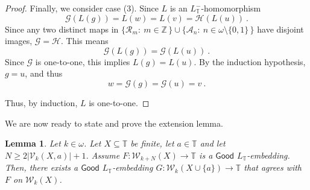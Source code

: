 \documentclass[10pt,a4paper, openany,  oldfontcommands]{memoir}
\newtheorem{lemma} [theorem] {Lemma}
\newtheorem{open problem} [theorem] {Open Problem}
\newtheorem{open question} [theorem] {Open Question}
\begin{document}
\begin{proof}
 
 Finally,  we consider case (3). 
 Since  $ L$  is  an $L_{  \mathbb{T}  }^-$-homomorphism 
\[
 \mathcal{G}    \left(  L(g)  \right)      =  L(w)   =  L(v)   =     \mathcal{H}    \left(  L(u)  \right)  
\     .
\]
Since   any two distinct maps in   
$  \big\lbrace   \mathcal{R}_m   :   \   m  \in  \mathbb{Z}   \,   \rbrace    \cup  
 \big\lbrace   \mathcal{A}_n   :   \   n   \in     \omega  \setminus  \lbrace 0,  1  \rbrace   \,   \rbrace         $ 
 have disjoint images,   
 $   \mathcal{G}    =    \mathcal{H}  $. 
 This means  
 \[
  \mathcal{G}    \left(  L(g)  \right)   =   \mathcal{G}    \left(  L(u)  \right) 
  \      .
 \] 
 Since     $    \mathcal{G}    $  is one-to-one,   this implies  
 $  L(g)  =  L(u)  $. 
 By the induction hypothesis,  $  g  =  u  $, and thus 
 \[
 w  =    \mathcal{G}    \left(  g \right)   =   \mathcal{G}    \left(  u \right)     =   v 
 \       .
 \]
 
 
 
 
 
 
 
 
 
Thus,  by induction,  $L$ is one-to-one.
\end{proof}






















We are now ready to state and prove the extension lemma. 


\begin{lemma}  \label{SectionQFirstExtensionLemma}
Let  $  k  \in  \omega  $. 
Let  $X \subseteq   \mathbb{T} $  be finite,  let  $  a  \in \mathbb{T} $     and  let 
$  N   \geq  2  \vert     \mathcal{V}_{ k   }  \left(  X, a  \right)    \vert  + 1 $. 
Assume     $  F :  \mathcal{W}_{ k + N }  \left(  X  \right)   \to  \mathbb{T}     $   is  a $  \mathsf{Good}  $     $  L_{  \mathbb{T} } $-embedding. 
Then, there exists  a   $  \mathsf{Good}  $   $  L_{  \mathbb{T} }$-embedding 
$
  G  :   \mathcal{W}_{  k  }  \left(  X  \cup  \lbrace a  \rbrace  \right)   \to   \mathbb{T} 
$
that agrees with  $F$ on    $  \mathcal{W}_{ k }  \left(  X  \right)    $.
\end{lemma}
\end{document}
